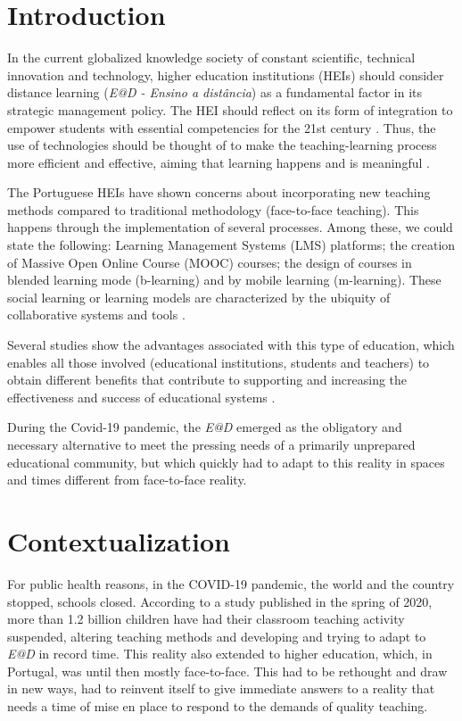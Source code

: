 \documentclass[english]{textolivre}
\begin{document}
\section{Introduction}\label{sec-intro}
In the current globalized knowledge society of constant scientific, technical innovation and technology, higher education institutions (HEIs) should consider distance learning (\emph{E@D - Ensino a distância}) as a fundamental factor in its strategic management policy. The HEI should reflect on its form of integration to empower students with essential competencies for the 21st century \cite{rodrigues2015}. Thus, the use of technologies should be thought of to make the teaching-learning process more efficient and effective, aiming that learning happens and is meaningful \cite{konrath2009}.

The Portuguese HEIs have shown concerns about incorporating new teaching methods compared to traditional methodology (face-to-face teaching). This happens through the implementation of several processes. Among these, we could state the following: Learning Management Systems (LMS) platforms; the creation of Massive Open Online Course (MOOC) courses; the design of courses in blended learning mode (b-learning) and by mobile learning (m-learning). These social learning or learning models are characterized by the ubiquity of collaborative systems and tools \cite{oliveira2015}.

Several studies show the advantages associated with this type of education, which enables all those involved (educational institutions, students and teachers) to obtain different benefits that contribute to supporting and increasing the effectiveness and success of educational systems \cite{alsabawy2016, mattar2020}.

During the Covid-19 pandemic, the \emph{E@D} emerged as the obligatory and necessary alternative to meet the pressing needs of a primarily unprepared educational community, but which quickly had to adapt to this reality in spaces and times different from face-to-face reality.

\section{Contextualization}
For public health reasons, in the COVID-19 pandemic, the world and the country stopped, schools closed. According to a study published in the spring of 2020, more than 1.2 billion children have had their classroom teaching activity suspended, altering teaching methods and developing and trying to adapt to \emph{E@D} in record time. This reality also extended to higher education, which, in Portugal, was until then mostly face-to-face. This had to be rethought and draw in new ways, had to reinvent itself to give immediate answers to a reality that needs a time of mise en place to respond to the demands of quality teaching.
\end{document}
